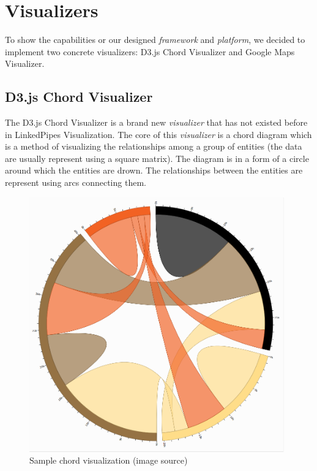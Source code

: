 \chapter{Visualizers}

To show the capabilities or our designed \emph{framework} and \emph{platform}, we decided to implement two concrete visualizers: D3.js Chord Visualizer and Google Maps Visualizer.

\section{D3.js Chord Visualizer}

The D3.js Chord Visualizer is a brand new \emph{visualizer} that has not existed before in LinkedPipes Visualization. The core of this \emph{visualizer} is a chord diagram which is a method of visualizing the relationships among a group of entities (the data are usually represent using a square matrix). The diagram is in a form of a circle around which the entities are drown. The relationships between the entities are represent using arcs connecting them.

\begin{figure}
	\centering
	\includegraphics[width=110mm]{img/06_chord_example.png}
	\caption[Sample chord visualization]{Sample chord visualization (image source\footnotemark)  }
	\label{fig:chord-example}
\end{figure}


